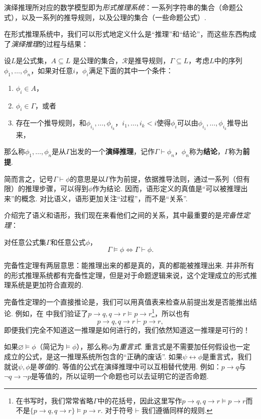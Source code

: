 演绎推理所对应的数学模型即为\textit{形式推理系统}：一系列字符串的集合（命题公式），以及一系列的推导规则，以及公理的集合（一些命题公式）. 

在形式推理系统中，我们可以形式地定义什么是“推理”和“结论”，而这些东西构成了\textit{演绎推理}的过程与结果：

\begin{definition}[演绎推理]
设$L$是公式集，$A\subseteq L$ 是公理的集合，$\mathcal R$是推导规则，$\Gamma\subseteq L$，考虑$L$中的序列$\phi_1,\dots,\phi_n$，如果对任意$i$，$\phi_i$满足下面的其中一个条件：
\begin{enumerate}
    \item $\phi_i\in A$，
    \item $\phi_i\in\Gamma$，或者
    \item 存在一个推导规则，和$\phi_{i_1},\dots,\phi_{i_k}$，$i_1,\dots,i_k<i$使得$\phi_i$可以由$\phi_{i_1},\dots,\phi_{i_k}$推导出来，
\end{enumerate}
那么称$\phi_1,\dots,\phi_n$是从$\Gamma$出发的一个\textbf{演绎推理}，记作$\Gamma\vdash\phi_n$，$\phi_n$称为\textbf{结论}，$\Gamma$称为\textbf{前提}.
\end{definition}


简而言之，记号$\Gamma\vdash\phi$的意思是以$\Gamma$作为前提，依据推导法则，通过一系列（但有限）的推理步骤，可以得到$\phi$作为结论. 因而，语形定义的真值是“可以被推理出来”的概念. 对比语义，语形更加关注“过程”，而不是“关系”.

介绍完了语义和语形，我们现在来看他们之间的关系，其中最重要的是\textit{完备性定理}：
\begin{theorem}[完备性定理]
对任意公式集$\Gamma$和任意公式$\phi$，
\[\Gamma\vDash\phi\iff\Gamma\vdash\phi.\]
\end{theorem}

完备性定理有两层意思：能推理出来的都是真的，真的都能被推理出来. 并非所有的形式推理系统都有完备性定理，但是对于命题逻辑来说，这个定理成立的形式推理系统是更加符合直观的. 

完备性定理的一个直接推论是，我们可以用真值表来检查从前提出发是否能推出结论. 例如，在 中我们验证了$p\to q,q\to r\vDash p\to r$\footnote{在书写时，我们常常省略$\Gamma$中的花括号，因此这里写作$p\to q,q\to r\vDash p\to r$而不是$\{p\to q,q\to r\}\vDash p\to r$. 对于符号$\vdash$我们遵循同样的规则.}，所以也有
\[p\to q,q\to r\vdash p\to r,\]
即便我们完全不知道这一推理是如何进行的，我们依然知道这一推理是可行的！

如果$\varnothing\vDash \phi$（简记为$\vDash\phi$），那么称$\phi$为\textit{重言式}. 重言式是不需要加任何假设也一定成立的公式，是这一推理系统所包含的“正确的废话”. 如果$\psi\leftrightarrow\phi$是重言式，我们就说$\psi,\phi$是\textit{等值}的. 等值的公式在演绎推理中可以互相替代使用. 例如：$p\to q$与$\neg q\to\neg p$是等值的，所以证明一个命题也可以去证明它的逆否命题.

